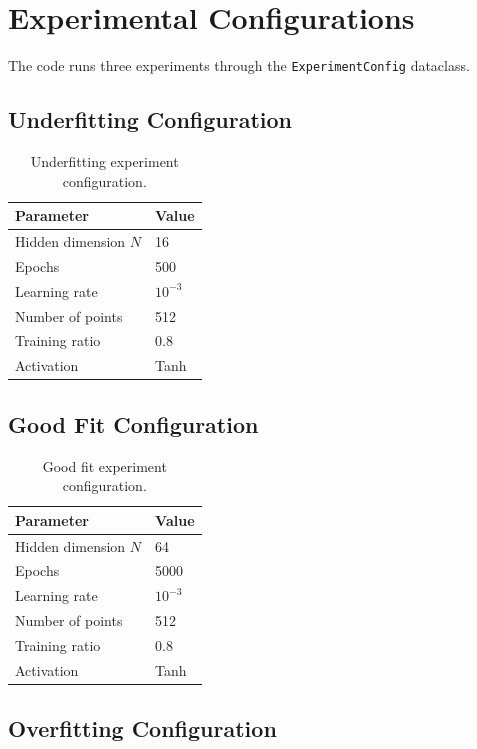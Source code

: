 \documentclass[11pt]{article}
\begin{document}
\section{Experimental Configurations}

The code runs three experiments through the \texttt{ExperimentConfig} dataclass.

\subsection{Underfitting Configuration}

\begin{table}[H]
\centering
\begin{tabular}{ll}
\toprule
Parameter & Value \\
\midrule
Hidden dimension $N$ & 16 \\
Epochs & 500 \\
Learning rate & $10^{-3}$ \\
Number of points & 512 \\
Training ratio & 0.8 \\
Activation & Tanh \\
\bottomrule
\end{tabular}
\caption{Underfitting experiment configuration.}
\end{table}

\subsection{Good Fit Configuration}

\begin{table}[H]
\centering
\begin{tabular}{ll}
\toprule
Parameter & Value \\
\midrule
Hidden dimension $N$ & 64 \\
Epochs & 5000 \\
Learning rate & $10^{-3}$ \\
Number of points & 512 \\
Training ratio & 0.8 \\
Activation & Tanh \\
\bottomrule
\end{tabular}
\caption{Good fit experiment configuration.}
\end{table}

\subsection{Overfitting Configuration}
\end{document}
